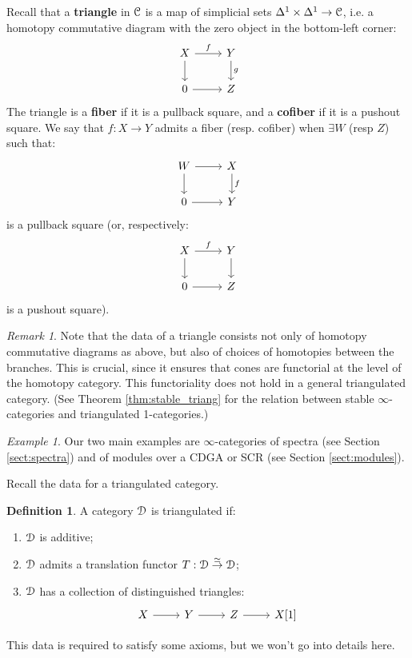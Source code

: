 \documentclass[10pt,a4paper,reqno,oneside]{book} %
\theoremstyle{plain}
\theoremstyle{definition}
\newtheorem{defin}[thm]{Definition}
\theoremstyle{remark}
\newtheorem{eg}[thm]{Example}
\newtheorem{rem}[thm]{Remark}
\numberwithin{equation}{section}
\begin{document}
Recall that a \textbf{triangle} in $\mathcal C$ is a map of simplicial sets $\Delta^1 \times \Delta^1 \to \mathcal C$,
i.e. a homotopy commutative diagram with the zero object in the bottom-left corner:
\[
\begin{tikzcd}
X\arrow{r}{f}\arrow{d} & Y\arrow{d}{g} \\
0\arrow{r} & Z
\end{tikzcd}
\]
The triangle is a \textbf{fiber} if it is a pullback square, and a \textbf{cofiber} if it is a pushout square. We say
that $f: X \to Y$ admits a fiber (resp. cofiber) when $\exists W$ (resp $Z$) such that:
\[
\begin{tikzcd}
W\arrow{r}\arrow{d} & X\arrow{d}{f} \\
0\arrow{r} & Y
\end{tikzcd}
\]
is a pullback square (or, respectively:
\[
\begin{tikzcd}
X\arrow{r}{f}\arrow{d} & Y\arrow{d} \\
0\arrow{r} & Z
\end{tikzcd}
\]
is a pushout square).

\begin{rem}
Note that the data of a triangle consists not only of homotopy commutative diagrams as above, but also of choices of 
homotopies between the branches. This is crucial, since it ensures that cones are
functorial at the level of the homotopy category. This functoriality does not hold in a general triangulated category. 
(See Theorem \ref{thm:stable_triang} for the relation between stable
$\infty$-categories and triangulated 1-categories.)
\end{rem}

\begin{eg}
Our two main examples are $\infty$-categories of spectra (see Section \ref{sect:spectra}) and of modules over a CDGA or SCR
(see Section \ref{sect:modules}).
\end{eg}

Recall the data for a triangulated category.

\begin{defin}
A category $\mathcal D$ is triangulated if:
\begin{enumerate}
\item $\mathcal D$ is additive;
\item \label{item:translation_equiv}
 $\mathcal D$ admits a translation functor $T : \mathcal D \overset{\simeq}{\to} \mathcal D$;
\item $\mathcal D$ has a collection of distinguished triangles:
\[
\begin{tikzcd}
X\arrow{r} & Y \arrow{r} & Z \arrow{r} & X[1]
\end{tikzcd}
\]
\end{enumerate}
This data is required to satisfy some axioms, but we won't go into details here.
\end{defin}
\end{document}
